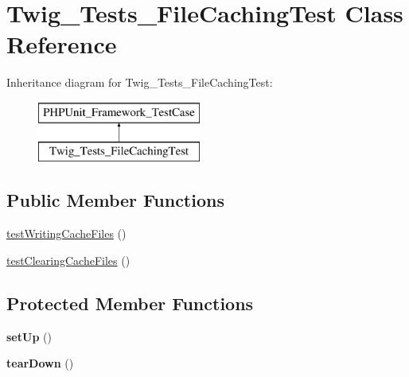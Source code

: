 \hypertarget{classTwig__Tests__FileCachingTest}{}\section{Twig\+\_\+\+Tests\+\_\+\+File\+Caching\+Test Class Reference}
\label{classTwig__Tests__FileCachingTest}
Inheritance diagram for Twig\+\_\+\+Tests\+\_\+\+File\+Caching\+Test\+:\begin{figure}[H]
\begin{center}
\leavevmode
\includegraphics[height=2.000000cm]{classTwig__Tests__FileCachingTest}
\end{center}
\end{figure}
\subsection*{Public Member Functions}
\begin{DoxyCompactItemize}
\item 
\hyperlink{classTwig__Tests__FileCachingTest_a1cee2cead686b7d215b768e92ac6b639}{test\+Writing\+Cache\+Files} ()
\item 
\hyperlink{classTwig__Tests__FileCachingTest_a85e1fe6e5b5cd5f13450762f4c17eb1f}{test\+Clearing\+Cache\+Files} ()
\end{DoxyCompactItemize}
\subsection*{Protected Member Functions}
\begin{DoxyCompactItemize}
\item 
{\bfseries set\+Up} ()\hypertarget{classTwig__Tests__FileCachingTest_af8bf5cf9d91dde85f0c98ad024fe185f}{}\label{classTwig__Tests__FileCachingTest_af8bf5cf9d91dde85f0c98ad024fe185f}

\item 
{\bfseries tear\+Down} ()\hypertarget{classTwig__Tests__FileCachingTest_aced3c151db58e61dabbb8b3bd9e8558d}{}\label{classTwig__Tests__FileCachingTest_aced3c151db58e61dabbb8b3bd9e8558d}

\end{DoxyCompactItemize}


